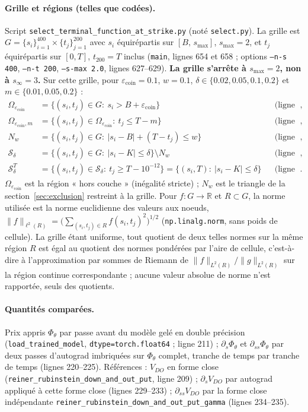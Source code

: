 \documentclass[11pt]{article}
\newcommand{\epscoin}{\varepsilon_{\mathrm{coin}}}
\newcommand{\VDO}{V_{DO}}
\newcommand{\code}[1]{\texttt{#1}}
\begin{document}
\paragraph{Grille et régions (telles que codées).} Script
\code{select\_terminal\_function\_at\_strike.py} (noté \code{select.py}).
La grille est $G=\{s_i\}_{i=1}^{400}\times\{t_j\}_{j=1}^{200}$ avec
$s_i$ équirépartis sur $[B,\,s_{\max}]$, $s_{\max}=2$, et $t_j$ équirépartis
sur $[0,T]$, $t_{200}=T$ inclus (\code{main}, lignes 654 et 658 ; options
\code{--n-s 400}, \code{--n-t 200}, \code{--s-max 2.0}, lignes 627--629).
\textbf{La grille s'arrête à $s_{\max}=2$, non à $s_\infty=3$.} Sur cette
grille, pour $\epscoin=0.1$, $w=0.1$, $\delta\in\{0.02,0.05,0.1,0.2\}$ et
$m\in\{0.01,0.05,0.2\}$ :
\begin{align*}
\Omega_{\epscoin} &= \{(s_i,t_j)\in G:\ s_i> B+\epscoin\}
  && \text{(ligne 278)},\\
\Omega_{\epscoin,m} &= \{(s_i,t_j)\in\Omega_{\epscoin}:\ t_j\le T-m\}
  && \text{(ligne 284)},\\
N_w &= \{(s_i,t_j)\in G:\ |s_i-B|+(T-t_j)\le w\}
  && \text{(ligne 239)},\\
\mathcal S_\delta &= \{(s_i,t_j)\in G:\ |s_i-K|\le\delta\}\setminus N_w
  && \text{(ligne 290)},\\
\mathcal S_\delta^{T} &= \{(s_i,t_j)\in\mathcal S_\delta:\ t_j\ge T-10^{-12}\}
  = \{(s_i,T):\ |s_i-K|\le\delta\}
  && \text{(ligne 310)}.
\end{align*}
$\Omega_{\epscoin}$ est la région « hors couche » (inégalité stricte) ; $N_w$ est
le triangle de la section~\ref{sec:exclusion} restreint à la grille.
Pour $f:G\to\mathbb R$ et $R\subset G$, la norme utilisée est la norme
euclidienne des valeurs aux noeuds,
$\|f\|_{\ell^2(R)}=\big(\sum_{(s_i,t_j)\in R}f(s_i,t_j)^2\big)^{1/2}$
(\code{np.linalg.norm}, sans poids de cellule). La grille étant uniforme,
tout quotient de deux telles normes sur la même région $R$ est égal au
quotient des normes pondérées par l'aire de cellule, c'est-à-dire à
l'approximation par sommes de Riemann de
$\|f\|_{L^2(R)}/\|g\|_{L^2(R)}$ sur la région continue correspondante ;
aucune valeur absolue de norme n'est rapportée, seuls des quotients.

\paragraph{Quantités comparées.} Prix appris $\Phi_\theta$ par passe avant du
modèle gelé en double précision (\code{load\_trained\_model}, \code{dtype=torch.float64} ;
ligne 211) ; $\partial_s\Phi_\theta$ et $\partial_{ss}\Phi_\theta$ par deux
passes d'autograd imbriquées sur $\Phi_\theta$ complet, tranche de temps par
tranche de temps (lignes 220--225). Références : $\VDO$ en forme close
(\code{reiner\_rubinstein\_down\_and\_out\_put}, ligne 209) ; $\partial_s\VDO$
par autograd appliqué à cette forme close (lignes 229--233) ;
$\partial_{ss}\VDO$ par la forme close indépendante
\code{reiner\_rubinstein\_down\_and\_out\_put\_gamma} (lignes 234--235).
\end{document}
